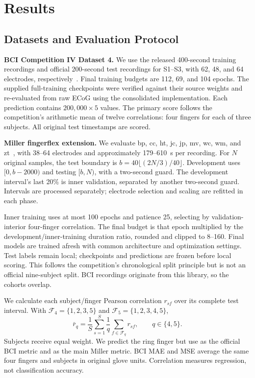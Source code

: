 \section{Results}
\subsection{Datasets and Evaluation Protocol}
\textbf{BCI Competition IV Dataset 4.} We use the released 400-second training recordings and official 200-second test recordings for S1--S3, with 62, 48, and 64 electrodes, respectively~\cite{competition2008}. Final training budgets are 112, 69, and 104 epochs. The supplied full-training checkpoints were verified against their source weights and re-evaluated from raw ECoG using the consolidated implementation. Each prediction contains $200{,}000\times5$ values. The primary score follows the competition's arithmetic mean of twelve correlations: four fingers for each of three subjects. All original test timestamps are scored.

\textbf{Miller fingerflex extension.} We evaluate bp, cc, ht, jc, jp, mv, wc, wm, and zt~\cite{miller2019}, with 38--64 electrodes and approximately 179--610~s per recording. For $N$ original samples, the test boundary is $b=40\lfloor(2N/3)/40\rfloor$. Development uses $[0,b-2000)$ and testing $[b,N)$, with a two-second guard. The development interval's last 20\% is inner validation, separated by another two-second guard. Intervals are processed separately; electrode selection and scaling are refitted in each phase.

Inner training uses at most 100 epochs and patience 25, selecting by validation-interior four-finger correlation. The final budget is that epoch multiplied by the development/inner-training duration ratio, rounded and clipped to 8--160. Final models are trained afresh with common architecture and optimization settings. Test labels remain local; checkpoints and predictions are frozen before local scoring. This follows the competition's chronological split principle but is not an official nine-subject split. BCI recordings originate from this library, so the cohorts overlap.

We calculate each subject/finger Pearson correlation $r_{sf}$ over its complete test interval. With $\mathcal F_4=\{1,2,3,5\}$ and $\mathcal F_5=\{1,2,3,4,5\}$,
\begin{equation}
\bar r_q=\frac{1}{S}\sum_{s=1}^{S}\frac{1}{q}\sum_{f\in\mathcal F_q}r_{sf},\qquad q\in\{4,5\}.
\end{equation}
Subjects receive equal weight. We predict the ring finger but use \rFour{} as the official BCI metric and \rFive{} as the main Miller metric. BCI MAE and MSE average the same four fingers and subjects in original glove units. Correlation measures regression, not classification accuracy.


